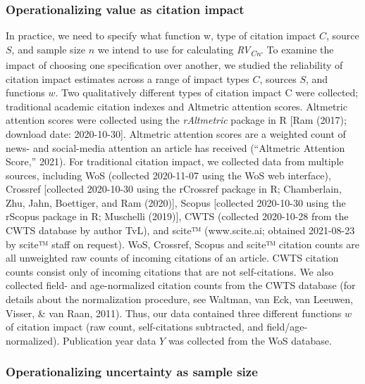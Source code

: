 \documentclass[
  man,floatsintext]{apa6}
\begin{document}
\hypertarget{operationalizing-value-as-citation-impact}{%
\subsubsection{Operationalizing value as citation impact}\label{operationalizing-value-as-citation-impact}}

In practice, we need to specify what function w, type of citation impact \(C\), source \(S\), and sample size \(n\) we intend to use for calculating \emph{RV\textsubscript{Cn}}. To examine the impact of choosing one specification over another, we studied the reliability of citation impact estimates across a range of impact types \(C\), sources \(S\), and functions \(w\). Two qualitatively different types of citation impact C were collected; traditional academic citation indexes and Altmetric attention scores. Altmetric attention scores were collected using the \emph{rAltmetric} package in R {[}Ram (2017); download date: 2020-10-30{]}. Altmetric attention scores are a weighted count of news- and social-media attention an article has received ({``Altmetric {Attention Score},''} 2021). For traditional citation impact, we collected data from multiple sources, including WoS (collected 2020-11-07 using the WoS web interface), Crossref {[}collected 2020-10-30 using the rCrossref package in R; Chamberlain, Zhu, Jahn, Boettiger, and Ram (2020){]}, Scopus {[}collected 2020-10-30 using the rScopus package in R; Muschelli (2019){]}, CWTS (collected 2020-10-28 from the CWTS database by author TvL), and scite™ (www.scite.ai; obtained 2021-08-23 by scite™ staff on request). WoS, Crossref, Scopus and scite™ citation counts are all unweighted raw counts of incoming citations of an article. CWTS citation counts consist only of incoming citations that are not self-citations. We also collected field- and age-normalized citation counts from the CWTS database (for details about the normalization procedure, see Waltman, van Eck, van Leeuwen, Visser, \& van Raan, 2011). Thus, our data contained three different functions \(w\) of citation impact (raw count, self-citations subtracted, and field/age-normalized). Publication year data \(Y\) was collected from the WoS database.

\hypertarget{operationalizing-uncertainty-as-sample-size}{%
\subsubsection{Operationalizing uncertainty as sample size}\label{operationalizing-uncertainty-as-sample-size}}
\end{document}
